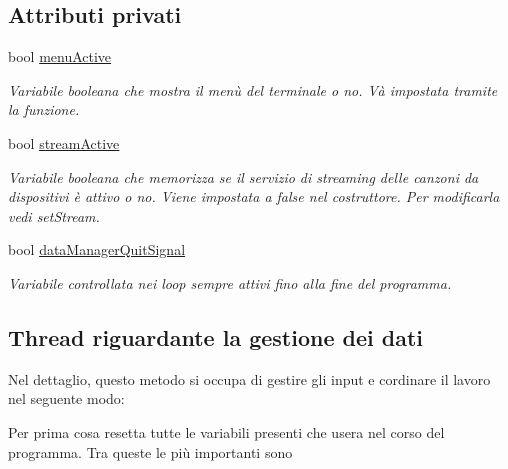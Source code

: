 \subsection*{\-Attributi privati}
\begin{DoxyCompactItemize}
\item 
bool \hyperlink{classdataManager_a7126a92f131b786ecf68b7a27d58d814}{menu\-Active}
\begin{DoxyCompactList}\small\item\em \-Variabile booleana che mostra il menù del terminale o no. \-Và impostata tramite la funzione. \end{DoxyCompactList}\item 
bool \hyperlink{classdataManager_a73070a3be96596028b91542367e1ebdd}{stream\-Active}
\begin{DoxyCompactList}\small\item\em \-Variabile booleana che memorizza se il servizio di streaming delle canzoni da dispositivi è attivo o no. \-Viene impostata a false nel costruttore. \-Per modificarla vedi set\-Stream. \end{DoxyCompactList}\item 
\hypertarget{classdataManager_a76b9dba2dde86540f5f37f3b5840653e}{bool \hyperlink{classdataManager_a76b9dba2dde86540f5f37f3b5840653e}{data\-Manager\-Quit\-Signal}}\label{classdataManager_a76b9dba2dde86540f5f37f3b5840653e}

\begin{DoxyCompactList}\small\item\em \-Variabile controllata nei loop sempre attivi fino alla fine del programma. \end{DoxyCompactList}\end{DoxyCompactItemize}
\subsection*{\-Thread riguardante la gestione dei dati}
\label{_amgrp53528b101885da6ed1a282e86901c1bc}%
 \-Nel dettaglio, questo metodo si occupa di gestire gli input e cordinare il lavoro nel seguente modo\-: \par
 \-Per prima cosa resetta tutte le variabili presenti che usera nel corso del programma. \-Tra queste le più importanti sono \par

